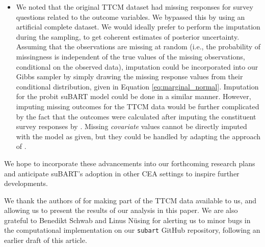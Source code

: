 \documentclass[aoas,preprint]{imsart}
\theoremstyle{plain}
\theoremstyle{definition}
\theoremstyle{remark}
\begin{document}
\begin{itemize}[wide]
    \item We noted that the original TTCM dataset had missing responses for survey questions related to the outcome variables. We bypassed this by using an artificial complete dataset. We would ideally prefer to perform the imputation during the sampling, to get coherent estimates of posterior uncertainty. Assuming that the observations are missing at random (i.e., the probability of missingness is independent of the true values of the missing observations, conditional on the observed data), imputation could be incorporated into our Gibbs sampler by simply drawing the missing response values from their conditional distribution, given in Equation \eqref{eq:marginal_normal}. Imputation for the probit suBART model could be done in a similar manner. However, imputing missing outcomes for the TTCM data would be further complicated by the fact that the outcomes were calculated after imputing the constituent survey responses by \citet{wiertsema2019cost}. 
    Missing \textit{covariate} values cannot be directly imputed with the model as given, but they could be handled by adapting the approach of \citet{kapelner2016bartmachine}.
\end{itemize}

We hope to incorporate these advancements into our forthcoming research plans and anticipate suBART's adoption in other CEA settings to inspire further developments.

\begin{acks}[Acknowledgments]
\small
We thank the authors of \citet{wiertsema2019cost} for making part of the TTCM data available to us, and allowing us to present the results of our analysis in this paper. We are also grateful to Benedikt Schwab and Linus N{\"{u}}sing for alerting us to minor bugs in the computational implementation on our \texttt{subart} GitHub repository, following an earlier draft of this article.
\end{acks}
\end{document}
